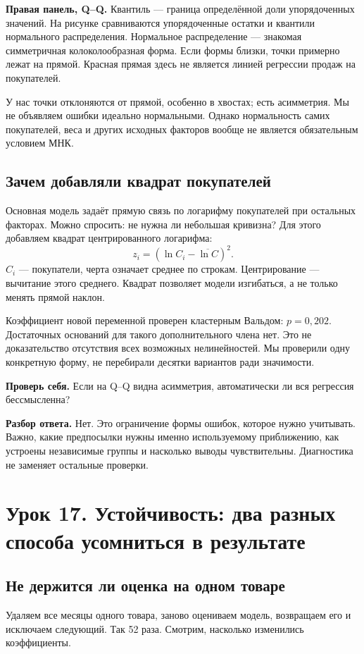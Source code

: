 \documentclass[12pt,a4paper]{article}
\newcommand{\check}[2]{\par\textbf{Проверь себя.} #1\par\textbf{Разбор ответа.} #2\par}
\begin{document}
\textbf{Правая панель, Q--Q.} Квантиль --- граница определённой доли упорядоченных значений. На рисунке сравниваются упорядоченные остатки и квантили нормального распределения. Нормальное распределение --- знакомая симметричная колоколообразная форма. Если формы близки, точки примерно лежат на прямой. Красная прямая здесь не является линией регрессии продаж на покупателей.

У нас точки отклоняются от прямой, особенно в хвостах; есть асимметрия. Мы не объявляем ошибки идеально нормальными. Однако нормальность самих покупателей, веса и других исходных факторов вообще не является обязательным условием МНК.

\subsection{Зачем добавляли квадрат покупателей}

Основная модель задаёт прямую связь по логарифму покупателей при остальных факторах. Можно спросить: не нужна ли небольшая кривизна? Для этого добавляем квадрат центрированного логарифма:
\[
 z_i=(\ln C_i-\overline{\ln C})^2.
\]
$C_i$ --- покупатели, черта означает среднее по строкам. Центрирование --- вычитание этого среднего. Квадрат позволяет модели изгибаться, а не только менять прямой наклон.

Коэффициент новой переменной проверен кластерным Вальдом: $p=0{,}202$. Достаточных оснований для такого дополнительного члена нет. Это не доказательство отсутствия всех возможных нелинейностей. Мы проверили одну конкретную форму, не перебирали десятки вариантов ради значимости.

\check{Если на Q--Q видна асимметрия, автоматически ли вся регрессия бессмысленна?}{Нет. Это ограничение формы ошибок, которое нужно учитывать. Важно, какие предпосылки нужны именно используемому приближению, как устроены независимые группы и насколько выводы чувствительны. Диагностика не заменяет остальные проверки.}

\section{Урок 17. Устойчивость: два разных способа усомниться в результате}

\subsection{Не держится ли оценка на одном товаре}

Удаляем все месяцы одного товара, заново оцениваем модель, возвращаем его и исключаем следующий. Так 52 раза. Смотрим, насколько изменились коэффициенты.
\end{document}
